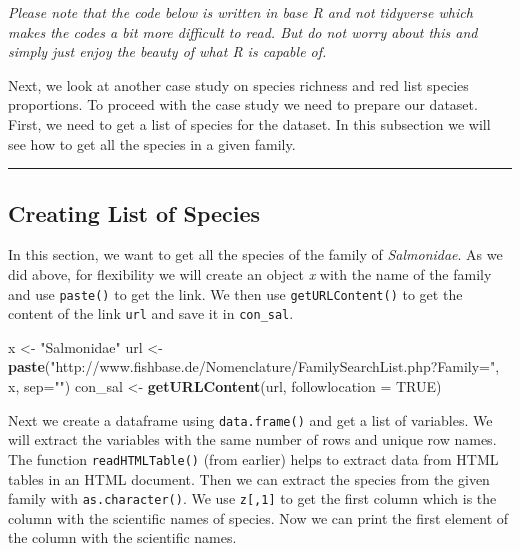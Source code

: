 \documentclass[
]{book}
\newenvironment{Shaded}{\begin{snugshade}}{\end{snugshade}}
\newcommand{\DataTypeTok}[1]{\textcolor[rgb]{0.13,0.29,0.53}{#1}}
\newcommand{\KeywordTok}[1]{\textcolor[rgb]{0.13,0.29,0.53}{\textbf{#1}}}
\newcommand{\NormalTok}[1]{#1}
\newcommand{\OtherTok}[1]{\textcolor[rgb]{0.56,0.35,0.01}{#1}}
\newcommand{\StringTok}[1]{\textcolor[rgb]{0.31,0.60,0.02}{#1}}
\begin{document}
\emph{Please note that the code below is written in base R and not tidyverse which makes the codes a bit more difficult to read. But do not worry about this and simply just enjoy the beauty of what R is capable of.}

Next, we look at another case study on species richness and red list species proportions. To proceed with the case study we need to prepare our dataset. First, we need to get a list of species for the dataset. In this subsection we will see how to get all the species in a given family.

\begin{center}\rule{0.5\linewidth}{0.5pt}\end{center}

\hypertarget{creating-list-of-species}{%
\subsection{Creating List of Species}\label{creating-list-of-species}}

In this section, we want to get all the species of the family of \emph{Salmonidae}. As we did above, for flexibility we will create an object \emph{x} with the name of the family and use \texttt{paste()} to get the link.
We then use \texttt{getURLContent()} to get the content of the link \texttt{url} and save it in \texttt{con\_sal}.

\begin{Shaded}
\begin{Highlighting}[]
\NormalTok{x <-}\StringTok{ "Salmonidae"}
\NormalTok{url <-}\StringTok{ }\KeywordTok{paste}\NormalTok{(}\StringTok{"http://www.fishbase.de/Nomenclature/FamilySearchList.php?Family="}\NormalTok{, x, }\DataTypeTok{sep=}\StringTok{""}\NormalTok{) }
\NormalTok{con_sal <-}\StringTok{ }\KeywordTok{getURLContent}\NormalTok{(url, }\DataTypeTok{followlocation =} \OtherTok{TRUE}\NormalTok{) }
\end{Highlighting}
\end{Shaded}

Next we create a dataframe using \texttt{data.frame()} and get a list of variables. We will extract the variables with the same number of rows and unique row names. The function \texttt{readHTMLTable()} (from earlier) helps to extract data from HTML tables in an HTML document. Then we can extract the species from the given family with \texttt{as.character()}. We use \texttt{z{[},1{]}} to get the first column which is the column with the scientific names of species. Now we can print the first element of the column with the scientific names.
\end{document}
